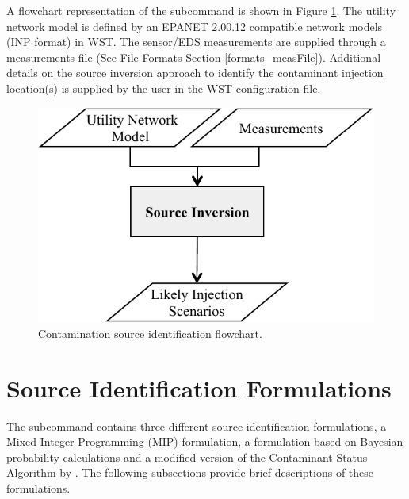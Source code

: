 A flowchart representation of
the  subcommand is shown in
Figure \ref{fig:inversion_command_flowchart}. The utility network model is
defined by an EPANET 2.00.12 compatible network models (INP format) in WST.
The sensor/EDS measurements are supplied through a measurements file
(See File Formats Section \ref{formats_measFile}). Additional details
on the source inversion approach to identify the contaminant injection
location(s) is supplied by the user in the WST configuration file.

\begin{figure}[h]
  \centering
  \includegraphics[scale=0.75]{graphics/inversion_flowchart.pdf}
  \caption{Contamination source identification flowchart.}
  \label{fig:inversion_command_flowchart}
\end{figure}

\section{Source Identification Formulations}\label{source_inversion_algorithms}
The  subcommand contains three different source identification
formulations, a Mixed Integer Programming (MIP) formulation, a
formulation based on Bayesian probability calculations and a modified
version of the Contaminant Status Algorithm by \citet{csa}. The following
subsections provide brief descriptions of these formulations. 

